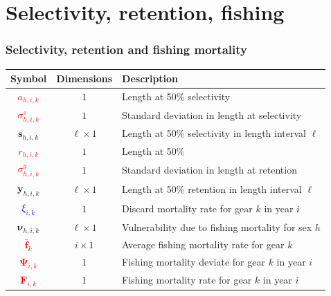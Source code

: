 \documentclass{beamer}
\begin{document}

\section{Selectivity, retention, fishing}


\begin{frame}
\frametitle{Selectivity, retention and fishing mortality}
\begin{table}
  \centering
  \begin{tabular}{ccl}
  \hline
  Symbol & Dimensions & Description \\
  \hline
      \textcolor{red}{$a_{h,i,k}$} & $1$ & Length at 50\% selectivity \\
      \textcolor{red}{$\sigma^s_{h,i,k}$} & $1$ & Standard deviation in length at selectivity \\
      $\boldsymbol{s}_{h,i,k}$ & $\ell \times 1$ & Length at 50\% selectivity in length interval $\ell$ \\
      \textcolor{red}{$r_{h,i,k}$} & $1$ & Length at 50\% \\
      \textcolor{red}{$\sigma^y_{h,i,k}$} & $1$ & Standard deviation in length at retention \\
      $\boldsymbol{y}_{h,i,k}$ & $\ell \times 1$ & Length at 50\% retention in length interval $\ell$ \\
      \textcolor{blue}{$\xi_{i,k}$} & $1$ & Discard mortality rate for gear $k$
      in year $i$ \\
      $\boldsymbol\nu_{h,i,k}$ & $\ell \times 1$ & Vulnerability due to fishing mortality for sex $h$ \\
      \textcolor{red}{$\bar{\boldsymbol{f}}_k$} & $i \times 1$ & Average fishing mortality rate for gear $k$ \\
      \textcolor{red}{$\boldsymbol\Psi_{i,k}$} & $1$ & Fishing mortality deviate for gear $k$ in year $i$ \\
      \textcolor{red}{$\boldsymbol{F}_{i,k}$} & $1$ & Fishing mortality rate for gear $k$ in year $i$ \\
  \hline
  \end{tabular}
\end{table}
\end{frame}
\end{document}
